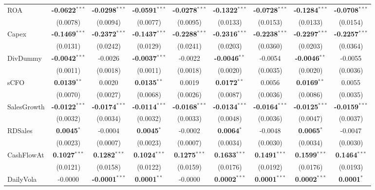 \documentclass[11pt,a4paper]{article}
\begin{document}
\begin{table}[htbp]
\begin{tabular}{lcccccccc}
ROA & \textbf{-0.0622}$^{***}$ & \textbf{-0.0298}$^{***}$ & \textbf{-0.0591}$^{***}$ & \textbf{-0.0278}$^{***}$ & \textbf{-0.1322}$^{***}$ & \textbf{-0.0728}$^{***}$ & \textbf{-0.1284}$^{***}$ & \textbf{-0.0708}$^{***}$ \\
 & (0.0078) & (0.0094) & (0.0077) & (0.0095) & (0.0133) & (0.0153) & (0.0133) & (0.0154) \\
Capex & \textbf{-0.1469}$^{***}$ & \textbf{-0.2372}$^{***}$ & \textbf{-0.1437}$^{***}$ & \textbf{-0.2288}$^{***}$ & \textbf{-0.2316}$^{***}$ & \textbf{-0.2238}$^{***}$ & \textbf{-0.2297}$^{***}$ & \textbf{-0.2257}$^{***}$ \\
 & (0.0131) & (0.0242) & (0.0129) & (0.0241) & (0.0203) & (0.0360) & (0.0203) & (0.0364) \\
DivDummy & \textbf{-0.0042}$^{***}$ & -0.0026 & \textbf{-0.0037}$^{***}$ & -0.0022 & \textbf{-0.0046}$^{**}$ & -0.0054 & \textbf{-0.0046}$^{**}$ & -0.0055 \\
 & (0.0011) & (0.0018) & (0.0011) & (0.0018) & (0.0020) & (0.0035) & (0.0020) & (0.0036) \\
sCFO & \textbf{0.0139}$^{**}$ & 0.0020 & \textbf{0.0135}$^{**}$ & 0.0019 & \textbf{0.0172}$^{**}$ & 0.0056 & \textbf{0.0169}$^{**}$ & 0.0055 \\
 & (0.0070) & (0.0027) & (0.0068) & (0.0026) & (0.0087) & (0.0036) & (0.0086) & (0.0035) \\
SalesGrowth & \textbf{-0.0122}$^{***}$ & \textbf{-0.0174}$^{***}$ & \textbf{-0.0114}$^{***}$ & \textbf{-0.0168}$^{***}$ & \textbf{-0.0134}$^{***}$ & \textbf{-0.0164}$^{***}$ & \textbf{-0.0125}$^{***}$ & \textbf{-0.0159}$^{***}$ \\
 & (0.0032) & (0.0034) & (0.0032) & (0.0033) & (0.0048) & (0.0036) & (0.0047) & (0.0037) \\
RDSales & \textbf{0.0045}$^{*}$ & -0.0004 & \textbf{0.0045}$^{*}$ & -0.0002 & \textbf{0.0064}$^{*}$ & -0.0048 & \textbf{0.0065}$^{*}$ & -0.0047 \\
 & (0.0023) & (0.0007) & (0.0023) & (0.0007) & (0.0034) & (0.0030) & (0.0034) & (0.0030) \\
CashFlowAt & \textbf{0.1027}$^{***}$ & \textbf{0.1282}$^{***}$ & \textbf{0.1024}$^{***}$ & \textbf{0.1275}$^{***}$ & \textbf{0.1633}$^{***}$ & \textbf{0.1491}$^{***}$ & \textbf{0.1599}$^{***}$ & \textbf{0.1464}$^{***}$ \\
 & (0.0121) & (0.0158) & (0.0122) & (0.0159) & (0.0176) & (0.0192) & (0.0176) & (0.0193) \\
DailyVola & -0.0000 & \textbf{-0.0001}$^{***}$ & \textbf{0.0001}$^{**}$ & -0.0000 & \textbf{0.0002}$^{***}$ & \textbf{0.0001}$^{***}$ & \textbf{0.0002}$^{***}$ & \textbf{0.0001}$^{*}$ \\

\end{tabular}
\end{table}
\end{document}
